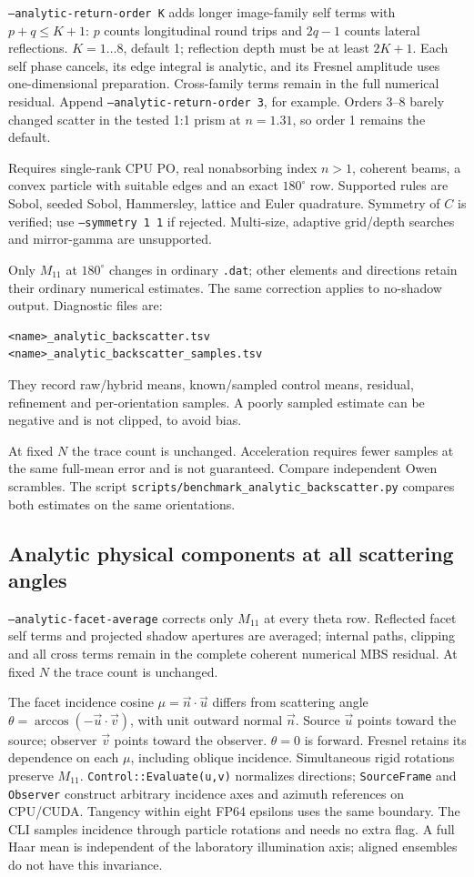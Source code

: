 \documentclass[
  10pt,
  a4paper,
]{article}
\begin{document}
\texttt{--analytic-return-order K} adds longer image-family self terms with
$p+q\leq K+1$: $p$ counts longitudinal round trips and $2q-1$ counts lateral
reflections. $K=1\ldots8$, default 1; reflection depth must be at least $2K+1$.
Each self phase cancels, its edge integral is analytic, and its Fresnel amplitude
uses one-dimensional preparation. Cross-family terms remain in the full
numerical residual. Append \texttt{--analytic-return-order 3}, for example.
Orders 3--8 barely changed scatter in the tested 1:1 prism at $n=1.31$,
so order 1 remains the default.

Requires single-rank CPU PO, real nonabsorbing index $n>1$, coherent beams,
a convex particle with suitable edges and an exact $180^\circ$ row. Supported
rules are Sobol, seeded Sobol, Hammersley, lattice and Euler quadrature.
Symmetry of $C$ is verified; use \texttt{--symmetry 1 1} if rejected.
Multi-size, adaptive grid/depth searches and mirror-gamma are unsupported.

Only $M_{11}$ at $180^\circ$ changes in ordinary \texttt{.dat}; other elements
and directions retain their ordinary numerical estimates. The same correction
applies to no-shadow output. Diagnostic files are:
\begin{verbatim}
<name>_analytic_backscatter.tsv
<name>_analytic_backscatter_samples.tsv
\end{verbatim}
They record raw/hybrid means, known/sampled control means, residual, refinement
and per-orientation samples.
A poorly sampled estimate can be negative and is not clipped, to avoid bias.

At fixed $N$ the trace count is unchanged. Acceleration requires fewer samples
at the same full-mean error and is not guaranteed. Compare independent Owen
scrambles. The script \texttt{scripts/benchmark\_analytic\_backscatter.py}
compares both estimates on the same orientations.

\subsection{Analytic physical components at all scattering angles}
\texttt{--analytic-facet-average} corrects only $M_{11}$ at every theta row.
Reflected facet self terms and projected shadow apertures are averaged;
internal paths, clipping and all cross terms remain in the complete coherent
numerical MBS residual. At fixed $N$ the trace count is unchanged.

The facet incidence cosine $\mu=\vec n\cdot\vec u$ differs from scattering
angle $\theta=\arccos(-\vec u\cdot\vec v)$, with unit outward normal $\vec n$.
Source $\vec u$ points toward the source; observer $\vec v$ points toward the
observer. $\theta=0$ is forward. Fresnel retains its dependence on each $\mu$,
including oblique incidence. Simultaneous rigid rotations preserve $M_{11}$.
\texttt{Control::Evaluate(u,v)} normalizes directions; \texttt{SourceFrame}
and \texttt{Observer} construct arbitrary incidence axes and azimuth references
on CPU/CUDA. Tangency within eight FP64 epsilons uses the same boundary.
The CLI samples incidence through particle rotations and needs no extra flag.
A full Haar mean is independent of the laboratory illumination axis; aligned
ensembles do not have this invariance.
\end{document}
